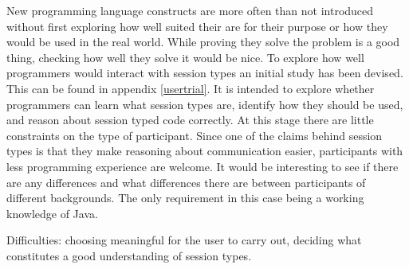 New programming language constructs are more often than not introduced without first exploring how well suited their are for their purpose or how they would be used in the real world. While proving they solve the problem is a good thing, checking how well they solve it would be nice.
To explore how well programmers would interact with session types an initial study has been devised. This can be found in appendix \ref{usertrial}. It is intended to explore whether programmers can learn what session types are, identify how they should be used, and reason about session typed code correctly. At this stage there are little constraints on the type of participant. Since one of the claims behind session types is that they make reasoning about communication easier, participants with less programming experience are welcome. It would be interesting to see if there are any differences and what differences there are between participants of different backgrounds. The only requirement in this case being a working knowledge of Java.

Difficulties: choosing meaningful for the user to carry out, deciding what constitutes a good understanding of session types.






